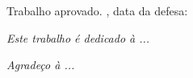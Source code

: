 \documentclass[
	12pt,				%
	oneside,
	a4paper,			%
    sumario=tradicional,%
	chapter=TITLE,		%
	english,			%
	french,				%
	spanish,			%
	brazil,				%
	]{abntex2}
\begin{document}

\begin{folhadeaprovacao}

  \begin{center}
    {\ABNTEXchapterfont\large\imprimirautor}

    \vspace*{\fill}\vspace*{\fill}
    \begin{center}
      \ABNTEXchapterfont\bfseries\Large\imprimirtitulo
    \end{center}
    \vspace*{\fill}
    
    \hspace{.45\textwidth}
    \begin{minipage}{.5\textwidth}
        \imprimirpreambulo
    \end{minipage}%
    \vspace*{\fill}
   \end{center}
        
   Trabalho aprovado. \imprimirlocal, data da defesa:

      
   \begin{center}
    \vspace*{0.5cm}
    {\large\imprimirlocal}
    \par
    {\large\imprimirdata}
    \vspace*{1cm}
  \end{center}
  
\end{folhadeaprovacao}

\begin{dedicatoria}
   \vspace*{\fill}
   \centering
   \noindent
   \textit{
   Este trabalho é dedicado  à ...
   } \vspace*{\fill}
\end{dedicatoria}

\begin{agradecimentos}

 \vspace*{\fill}
   \centering
   \noindent
   \textit{
   Agradeço  à ...
   } \vspace*{\fill}

\end{agradecimentos}
\end{document}
